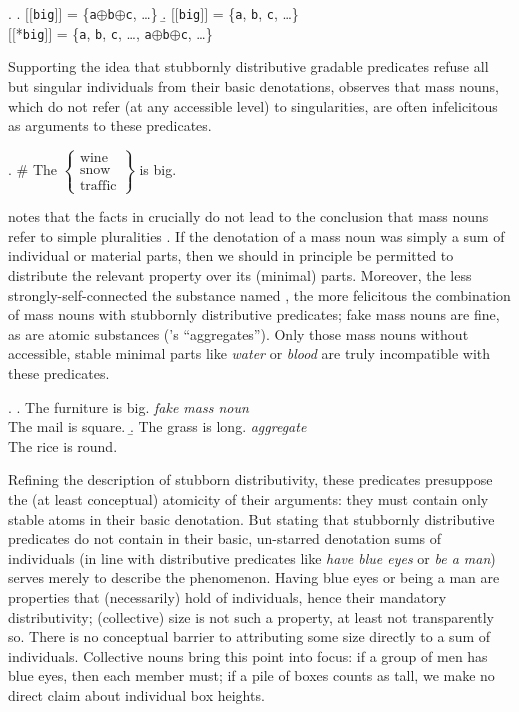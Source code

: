 \documentclass[linguex]{sp}
\newcommand{\sem}[1]{\mbox{$[\![$#1$]\!]$}}
\renewcommand{\tt}{\texttt}
\newcommand{\op}{$\oplus$}
\begin{document}
\ex. \a. \sem{\tt{big}} = \{\tt{a}\op\tt{b}\op\tt{c}, \ldots\}
\b. \sem{\tt{big}} = \{\tt{a}, \tt{b}, \tt{c}, \ldots\}\\
\sem{*\tt{big}} = \{\tt{a}, \tt{b}, \tt{c}, \ldots, \tt{a}\op\tt{b}\op\tt{c}, \ldots\}

Supporting the idea that stubbornly distributive gradable predicates refuse all but singular individuals from their basic denotations, \cite{schwarzschild2011} observes that mass nouns, which do not refer (at any accessible level) to singularities, are often infelicitous as arguments to these predicates.

\ex. \# The $\left\{\begin{array}{l}\text{wine}\\ \text{snow}\\ \text{traffic}\end{array}\right\}$ is big.

\citeauthor{schwarzschild2011} notes that  the facts in \Last crucially do not lead to the conclusion that mass nouns refer to simple pluralities \citep[cf., e.g.,][]{chierchia1998mass}. If the denotation of a mass noun was simply a sum of individual or material parts, then we should in principle be permitted to distribute the relevant property over its (minimal) parts. Moreover, the less strongly-self-connected the substance named  \citep[in the sense of][]{grimm2012}, the more felicitous the combination of mass nouns with stubbornly distributive predicates; fake mass nouns are fine, as are atomic substances (\citeauthor{grimm2012}'s ``aggregates''). Only those mass nouns without accessible, stable minimal parts like \emph{water} or \emph{blood} are truly incompatible with these predicates.

\ex. \a. The furniture is big. \hfill \emph{fake mass noun}\\
The mail is square.
\b. The grass is long. \hfill \emph{aggregate}\\
The rice is round.

Refining the description of stubborn distributivity, these predicates presuppose the (at least conceptual) atomicity of their arguments: they must contain only stable atoms in their basic denotation. But stating that stubbornly distributive predicates do not contain in their basic, un-starred denotation sums of individuals (in line with distributive predicates like \emph{have blue eyes} or \emph{be a man}) serves merely to describe the phenomenon. Having blue eyes or being a man are properties that (necessarily) hold of individuals, hence their mandatory distributivity; (collective) size is not such a property, at least not transparently so. There is no conceptual barrier to attributing some size directly to a sum of individuals. Collective nouns bring this point into focus: if a group of men has blue eyes, then each member must; if a pile of boxes counts as tall, we make no direct claim about individual box heights.
\end{document}
